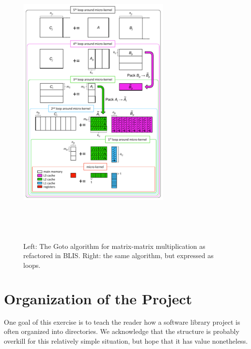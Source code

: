 \begin{figure}[tb!]
\begin{center}
\begin{minipage}{3in}
\mbox{\includegraphics[width=3.0in]{mm_blis_color.pdf}}
\end{minipage}
~~~
\begin{minipage}[t]{3in}
\footnotesize  
\mbox{  }
\end{minipage}
\end{center}
\caption{Left: The Goto algorithm for matrix-matrix multiplication as  
  refactored in BLIS.  Right: the same algorithm, but expressed as  
  loops.}
\label{fig:blis_gemm}
\end{figure}

\cite{Goto:2008:AHP}
\cite{BLIS1}
\cite{BLIS2}
\cite{BLIS3}
\cite{BLIS4}

\section{Organization of the Project}



One goal of this exercise is to teach the reader how a software library project is often organized into directories.  We acknowledge that the structure is probably overkill for this relatively simple situation, but hope that it has value nonetheless.





